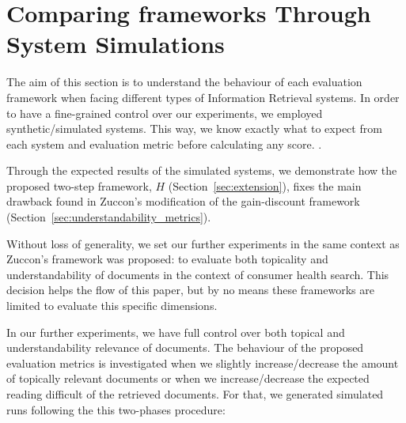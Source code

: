 
\section{Comparing frameworks Through System Simulations}
\label{sec:simulations}


The aim of this section is to understand the behaviour of each evaluation framework when facing different types of Information Retrieval systems.
In order to have a fine-grained control over our experiments, we employed synthetic/simulated systems.
This way, we know exactly what to expect from each system and evaluation metric before calculating any score.
.

Through the expected results of the simulated systems, we demonstrate how the proposed two-step framework, $H$ (Section~\ref{sec:extension}), fixes the main drawback found in Zuccon's modification of the gain-discount framework (Section~\ref{sec:understandability_metrics}). 

Without loss of generality, we set our further experiments in the same context as Zuccon's framework was proposed: to evaluate both topicality and understandability of documents in the context of consumer health search. This decision helps the flow of this paper, but by no means these frameworks are limited to evaluate this specific dimensions. 

In our further experiments, we have full control over both topical and understandability relevance of documents. 
The behaviour of the proposed evaluation metrics is investigated when we slightly increase/decrease the amount of topically relevant documents or when we increase/decrease the expected reading difficult of the retrieved documents. 
For that, we generated simulated runs following the this two-phases procedure:

